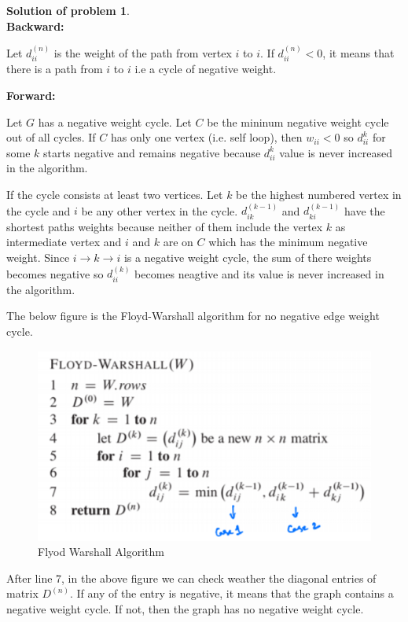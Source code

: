 \documentclass{article}
\theoremstyle{definition}
\newtheorem{problem}{Solution of problem}
\begin{document}
\begin{problem}
\hspace{2cm}\\
  \textbf{Backward:}

 Let $d_{ii}^{(n)}$ is the weight of the path from vertex $i$ to $i$. If $d_{ii}^{(n)} < 0$, it means that there is a path from $i$ to $i$ i.e a cycle of negative weight.

  \textbf{Forward:}

  Let $G$ has a negative weight cycle. Let $C$ be the mininum negative weight cycle out of all cycles. If $C$ has only one vertex (i.e. self loop), then $w_{ii} < 0$ so $d_{ii}^{k}$ for some $k$ starts negative and remains negative because $d_{ii}^{k}$ value is never increased in the algorithm. 

  If the cycle consists at least two vertices. Let $k$ be the highest numbered vertex in the cycle and $i$ be any other vertex in the cycle.  $d_{ik}^{(k-1)}$ and  $d_{ki}^{(k-1)}$ have the shortest paths weights because neither of them include the vertex $k$ as intermediate vertex and $i$ and $k$ are on $C$ which has the minimum negative weight. Since $i\rightarrow k \rightarrow i$ is a negative weight cycle, the sum of there weights becomes negative so  $d_{ii}^{(k)}$ becomes neagtive and its value is never increased in the algorithm. 
  
  The below figure is the Floyd-Warshall algorithm for no negative edge weight cycle.
  \begin{figure}[h!]
    \centering
    \includegraphics{floyd.PNG}
    \caption[]{Flyod Warshall Algorithm}
    \label{fig:Flyod}
  \end{figure}

  After line 7, in the above figure we can check weather the diagonal entries of matrix $D^{(n)}$. If any of the entry is negative, it means that the graph contains a negative weight cycle. If not, then the graph has no negative weight cycle. 


\end{problem}
\end{document}
